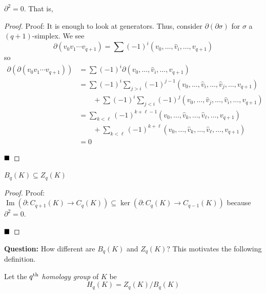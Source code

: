\begin{lemma}
    $\partial^2 = 0$. That is,
    \begin{center}
    \end{center}
\end{lemma}
\begin{proof}{Proof:}
    It is enough to look at generators. Thus, consider $\partial(\partial\sigma)$ for $\sigma$ a $(q + 1)$-simplex. We see
    \[ \partial(v_0v_1 \cdots v_{q + 1}) = \sum (-1)^{i}(v_0, \ldots, \widehat{v}_i, \ldots, v_{q + 1}) \]
    so
    \begin{align*}
        \partial(\partial(v_0v_1 \cdots v_{q + 1})) &= \sum (-1)^{i}\partial(v_0, \ldots, \widehat{v}_i, \ldots, v_{q + 1})\\
        &= \sum (-1)^{i}\sum_{j > i}(-1)^{j - 1}(v_0, \ldots, \widehat{v}_i, \ldots, \widehat{v}_j, \ldots, v_{q + 1})\\
        &\qquad + \sum (-1)^{i}\sum_{j < i}(-1)^{j}(v_0, \ldots, \widehat{v}_j, \ldots, \widehat{v}_i, \ldots, v_{q + 1})\\
        &= \sum_{k < \ell}(-1)^{k + \ell - 1}(v_0, \ldots, \widehat{v}_k, \ldots, \widehat{v}_{\ell}, \ldots, v_{q + 1})\\
        &\qquad + \sum_{k < \ell}(-1)^{k + \ell}(v_0, \ldots, \widehat{v}_k, \ldots, \widehat{v}_{\ell}, \ldots, v_{q + 1})\\
        &= 0
    \end{align*}

    $\qed$
\end{proof}

\begin{lemma}
    $B_q(K) \subseteq Z_q(K)$
\end{lemma}
\begin{proof}{Proof:}
    $\operatorname{Im}(\partial : C_{q + 1}(K) \to C_q(K)) \subseteq \ker(\partial : C_q(K) \to C_{q - 1}(K))$ because $\partial^2 = 0$.

    $\qed$
\end{proof}

\textbf{Question:} How different are $B_q(K)$ and $Z_q(K)$? This motivates the following definition.

\begin{definition}
    Let the \emph{$q^{\tt{th}}$ homology group} of $K$ be
    \[ H_q(K) = Z_q(K)/B_q(K) \]
\end{definition}


